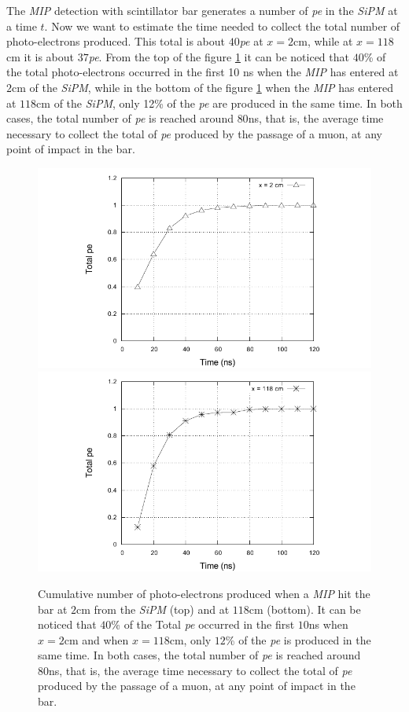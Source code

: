 \documentclass[submitting]{nst}
\begin{document}
The \textsl{MIP} detection with scintillator bar generates a number of \textsl{pe} in the \textsl{SiPM} at a time $t$. Now we want to estimate the time needed to collect the total number of photo-electrons produced. This total is about $40$\textsl{pe} at $x=2$cm, while at $x=118$cm it is about $37$\textsl{pe}. From the top of the figure \ref{cumulative} it can be noticed that $40$\% of the total photo-electrons occurred in the first 10 ns when the \textsl{MIP} has entered at $2$cm of the \textsl{SiPM}, while in the bottom of the figure \ref{cumulative} when the \textsl{MIP} has entered at $118$cm of the \textsl{SiPM}, only 12\% of the \textsl{pe} are produced in the same time. In both cases, the total number of \textsl{pe} is reached around $80$ns, that is, the average time necessary to collect the total of \textsl{pe} produced by the passage of a muon, at any point of impact in the bar.
\begin{figure}
    \centering
    \includegraphics[scale=0.8]{Figures/cumulativo_1.pdf}
    \includegraphics[scale=0.8]{Figures/cumulativo_2.pdf}
    \caption{Cumulative number of photo-electrons produced when a \textsl{MIP} hit the bar at $2$cm from the  \textsl{SiPM} (top) and at $118$cm (bottom). It can be noticed that $40$\% of the Total \textsl{pe} occurred in the first $10$ns when $x=2$cm and when $x=118$cm, only $12$\% of the \textsl{pe} is produced in the same time. In both cases, the total number of \textsl{pe} is reached around $80$ns, that is, the average time necessary to collect the total of \textsl{pe} produced by the passage of a muon, at any point of impact in the bar.}
    \label{cumulative}
\end{figure}
\end{document}
